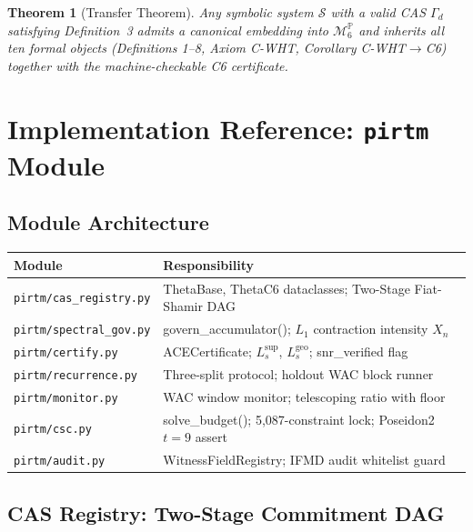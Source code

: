 \documentclass[12pt,letterpaper]{article}
\theoremstyle{definition}
\theoremstyle{plain}
\newtheorem{theorem}{Theorem}[section]
\theoremstyle{remark}
\newcommand{\Lsup}{L_s^{\sup}}
\newcommand{\Lgeo}{L_s^{\mathrm{geo}}}
\begin{document}
\begin{theorem}[Transfer Theorem]
Any symbolic system $\mathcal{S}$ with a valid CAS $\Gamma_d$ satisfying Definition~3 admits a canonical embedding into $\mathcal{M}_6^{\mathbb{P}}$ and inherits all ten formal objects (Definitions 1--8, Axiom C-WHT, Corollary C-WHT$\to$C6) together with the machine-checkable C6 certificate.
\end{theorem}

\section{Implementation Reference: \texttt{pirtm} Module}

\subsection{Module Architecture}

\begin{center}
\begin{tabular}{ll}
\toprule
Module & Responsibility \\
\midrule
\texttt{pirtm/cas\_registry.py} & ThetaBase, ThetaC6 dataclasses; Two-Stage Fiat-Shamir DAG \\
\texttt{pirtm/spectral\_gov.py} & govern\_accumulator(); $L_1$ contraction intensity $X_n$ \\
\texttt{pirtm/certify.py} & ACECertificate; $\Lsup$, $\Lgeo$; snr\_verified flag \\
\texttt{pirtm/recurrence.py} & Three-split protocol; holdout WAC block runner \\
\texttt{pirtm/monitor.py} & WAC window monitor; telescoping ratio with floor \\
\texttt{pirtm/csc.py} & solve\_budget(); 5,087-constraint lock; Poseidon2 $t=9$ assert \\
\texttt{pirtm/audit.py} & WitnessFieldRegistry; IFMD audit whitelist guard \\
\bottomrule
\end{tabular}
\end{center}

\subsection{CAS Registry: Two-Stage Commitment DAG}
\end{document}

